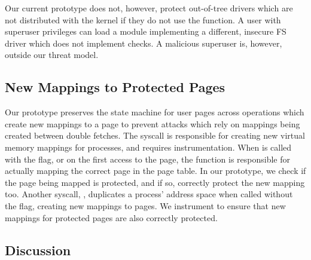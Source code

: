 \documentclass[letterpaper,twocolumn,10pt]{article}
\begin{document}
Our current prototype does not, however, protect out-of-tree drivers
which are not distributed with the kernel if they do not use the 
 function.
A user with superuser privileges can load a module implementing a 
different, insecure FS driver which does not implement \midas checks.
A malicious superuser is, however, outside our threat model.
%


\subsection{New Mappings to Protected Pages}

Our \midas prototype preserves the state machine for user pages
across operations which create new mappings to a page to prevent 
attacks which rely on mappings being created between double fetches.
The  syscall is responsible for creating new virtual
memory mappings for processes, and requires instrumentation.
When  is called with the  flag, or 
on the first access to the page, the  function 
is responsible for actually mapping the correct page in the 
page table. 
In our prototype, we check if the page being mapped is protected, 
and if so, correctly protect the new mapping too.
Another syscall, , duplicates a process' address space
when called without the  flag, creating new mappings
to pages. 
We instrument  to ensure that new mappings for protected 
pages are also correctly protected.


\subsection{Discussion}
\end{document}
